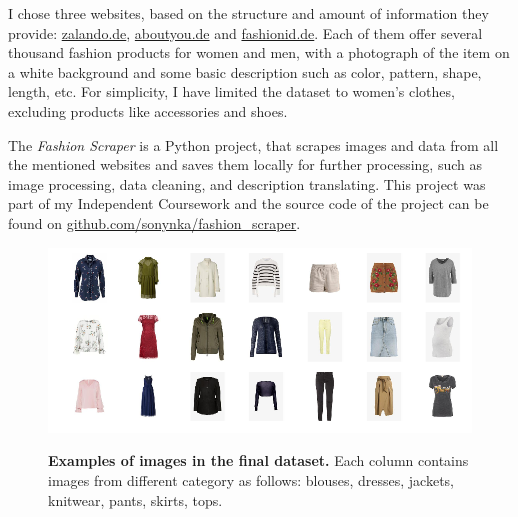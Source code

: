 \documentclass[12pt]{report}
\begin{document}
I chose three websites, based on the structure and amount of information they provide: \href{https://www.zalando.de/damen-home/}{zalando.de}, \href{https://www.aboutyou.de/}{aboutyou.de} and \href{https://www.fashionid.de/damen/}{fashionid.de}. Each of them offer several thousand fashion products for women and men, with a photograph of the item on a white background and some basic description such as color, pattern, shape, length, etc. For simplicity, I have limited the dataset to women's clothes, excluding products like accessories and shoes.

The \textit{Fashion Scraper} is a Python project, that scrapes images and data from all the mentioned websites and saves them locally for further processing, such as image processing, data cleaning, and description translating. This project was part of my Independent Coursework and the source code of the project can be found on \href{https://github.com/sonynka/fashion_scraper}{github.com/sonynka/fashion\_scraper}.

\begin{figure}[h]
\centering
{\includegraphics[width=\linewidth]{03_analysis/data/img_grid2}}
\caption{\label{fig:dataset} \textbf{Examples of images in the final dataset.} Each column contains images from different category as follows: blouses, dresses, jackets, knitwear, pants, skirts, tops.}
\end{figure}
\end{document}
